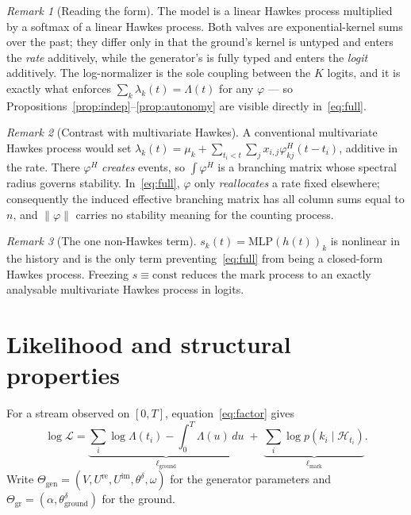 \documentclass[11pt]{article}
\theoremstyle{remark}
\newtheorem{remark}{Remark}
\newcommand{\Hist}{\mathcal{H}}
\begin{document}
\begin{remark}[Reading the form]
The model is a linear Hawkes process multiplied by a softmax of a linear Hawkes
process. Both valves are exponential-kernel sums over the past; they differ only
in that the ground's kernel is untyped and enters the \emph{rate} additively,
while the generator's is fully typed and enters the \emph{logit} additively. The
log-normalizer is the sole coupling between the $K$ logits, and it is exactly
what enforces $\sum_k\lambda_k(t)=\Lambda(t)$ for any $\varphi$ --- so
Propositions~\ref{prop:indep}--\ref{prop:autonomy} are visible directly
in~\eqref{eq:full}.
\end{remark}

\begin{remark}[Contrast with multivariate Hawkes]
A conventional multivariate Hawkes process would set
$\lambda_k(t)=\mu_k+\sum_{t_i<t}\sum_j x_{i,j}\varphi^{H}_{kj}(t-t_i)$,
additive in the rate. There $\varphi^{H}$ \emph{creates} events, so
$\int\varphi^{H}$ is a branching matrix whose spectral radius governs stability.
In~\eqref{eq:full}, $\varphi$ only \emph{reallocates} a rate fixed elsewhere;
consequently the induced effective branching matrix has all column sums equal to
$n$, and $\|\varphi\|$ carries no stability meaning for the counting process.
\end{remark}

\begin{remark}[The one non-Hawkes term]
$s_k(t)=\mathrm{MLP}(h(t))_k$ is nonlinear in the history and is the only term
preventing~\eqref{eq:full} from being a closed-form Hawkes process. Freezing
$s\equiv\text{const}$ reduces the mark process to an exactly analysable
multivariate Hawkes process in logits.
\end{remark}

\section{Likelihood and structural properties}

For a stream observed on $[0,T]$, equation~\eqref{eq:factor} gives
\begin{equation}
\log\mathcal{L}
=\underbrace{\sum_i\log\Lambda(t_i)-\int_0^T\Lambda(u)\,du}_{\textstyle \ell_{\mathrm{ground}}}
\;+\;\underbrace{\sum_i\log p(k_i\mid\Hist_{t_i})}_{\textstyle \ell_{\mathrm{mark}}} .
\label{eq:loglik}
\end{equation}
Write $\Theta_{\mathrm{gen}}=(V,U^{\mathrm{re}},U^{\mathrm{im}},
\theta^\delta,\omega)$ for the generator parameters and
$\Theta_{\mathrm{gr}}=(\alpha,\theta^\delta_{\mathrm{ground}})$ for the ground.
\end{document}
